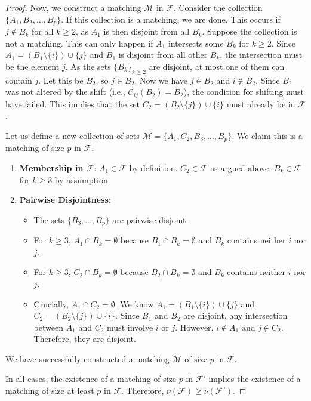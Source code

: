 \documentclass[10pt,a4paper]{amsart}
\begin{document}
\begin{proof}
	Now, we construct a matching $\mathcal{M}$ in $\mathcal{F}$. Consider the collection $\{A_1, B_2,\allowbreak \dots, B_p\}$.
	If this collection is a matching, we are done. This occurs if $j \notin B_k$ for all $k \geq 2$, as $A_1$ is then disjoint from all $B_k$.
	Suppose the collection is not a matching. This can only happen if $A_1$ intersects some $B_k$ for $k \geq 2$. Since $A_1 = (B_1 \setminus \{i\}) \cup \{j\}$ and $B_1$ is disjoint from all other $B_k$, the intersection must be the element $j$. As the sets $\{B_k\}_{k \geq 2}$ are disjoint, at most one of them can contain $j$. Let this be $B_2$, so $j \in B_2$.
	Now we have $j \in B_2$ and $i \notin B_2$. Since $B_2$ was not altered by the shift (i.e., $\mathcal{C}_{ij}(B_2) = B_2$), the condition for shifting must have failed. This implies that the set $C_2 = (B_2 \setminus \{j\}) \cup \{i\}$ must already be in $\mathcal{F}$.
	
	Let us define a new collection of sets $\mathcal{M} = \{A_1, C_2, B_3, \dots, B_p\}$. We claim this is a matching of size $p$ in $\mathcal{F}$.
	\begin{enumerate}
		\item \textbf{Membership in $\mathcal{F}$}: $A_1 \in \mathcal{F}$ by definition. $C_2 \in \mathcal{F}$ as argued above. $B_k \in \mathcal{F}$ for $k \geq 3$ by assumption.
		\item \textbf{Pairwise Disjointness}:
		\begin{itemize}
			\item The sets $\{B_3, \dots, B_p\}$ are pairwise disjoint.
			\item For $k \geq 3$, $A_1 \cap B_k = \emptyset$ because $B_1 \cap B_k = \emptyset$ and $B_k$ contains neither $i$ nor $j$.
			\item For $k \geq 3$, $C_2 \cap B_k = \emptyset$ because $B_2 \cap B_k = \emptyset$ and $B_k$ contains neither $i$ nor $j$.
			\item Crucially, $A_1 \cap C_2 = \emptyset$. We know $A_1 = (B_1 \setminus \{i\}) \cup \{j\}$ and $C_2 = (B_2 \setminus \{j\}) \cup \{i\}$. Since $B_1$ and $B_2$ are disjoint, any intersection between $A_1$ and $C_2$ must involve $i$ or $j$. However, $i \notin A_1$ and $j \notin C_2$. Therefore, they are disjoint.
		\end{itemize}
	\end{enumerate}
	We have successfully constructed a matching $\mathcal{M}$ of size $p$ in $\mathcal{F}$.
	
	In all cases, the existence of a matching of size $p$ in $\mathcal{F}'$ implies the existence of a matching of size at least $p$ in $\mathcal{F}$. Therefore, $\nu(\mathcal{F}) \ge \nu(\mathcal{F}')$. 
\end{proof}
\end{document}
